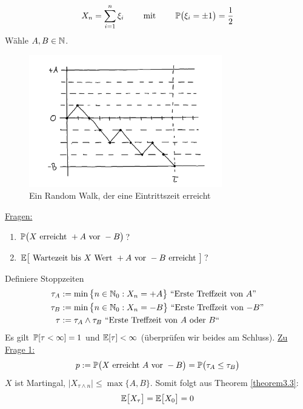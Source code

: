 \begin{beisp}
\begin{align*}
X_n=\sum\limits_{i=1}^n \xi_i\qquad\mit\qquad \P\big(\xi_i=\pm 1\big)=\frac{1}{2}
\end{align*}
Wähle $A,B\in\N$.
\begin{figure}[!ht]
	\center
	\includegraphics[width=0.75\textwidth]{./pics/Sketch0.png}
	\caption{Ein Random Walk, der eine Eintrittszeit erreicht}
	\label{AbbEintrittszeit}
\end{figure}
\enter
\underline{Fragen:} 
\begin{enumerate}
\item $\P\big( X\text{ erreicht }+A\text{ vor }-B\big)$?
\item $\E\big[\text{ Wartezeit bis }X\text{ Wert }+A\text{ vor }-B\text{ erreicht }\big]$?
\end{enumerate}
Definiere Stoppzeiten 
\begin{align*}
\tau_A&:=\min\big\lbrace n\in\N_0:X_n=+A\big\rbrace\text{ ``Erste Treffzeit von $A$''}\\
\tau_B&:=\min\big\lbrace n\in\N_0:X_n=-B\big\rbrace\text{ ``Erste Treffzeit von $-B$''}\\
\tau&:=\tau_A\wedge\tau_B\text{ ``Erste Treffzeit von $A$ oder $B$``}
\end{align*}
Es gilt $\P[\tau<\infty]=1$  und $\E[\tau]<\infty$ (überprüfen wir beides am Schluss).\nl
\underline{Zu Frage 1:}
\begin{align*}
p:=\P\big( X\text{ erreicht }A\text{ vor }-B\big)=\P\big(\tau_A\leq\tau_B\big)
\end{align*}
$X$ ist Martingal, $\big|X_{\tau\wedge n}\big|\leq\max\lbrace A,B\rbrace$. Somit folgt aus Theorem \ref{theorem3.3}:
\begin{align*}
\E\big[X_\tau\big]=\E\big[X_0\big]=0
\end{align*}

\end{beisp}
